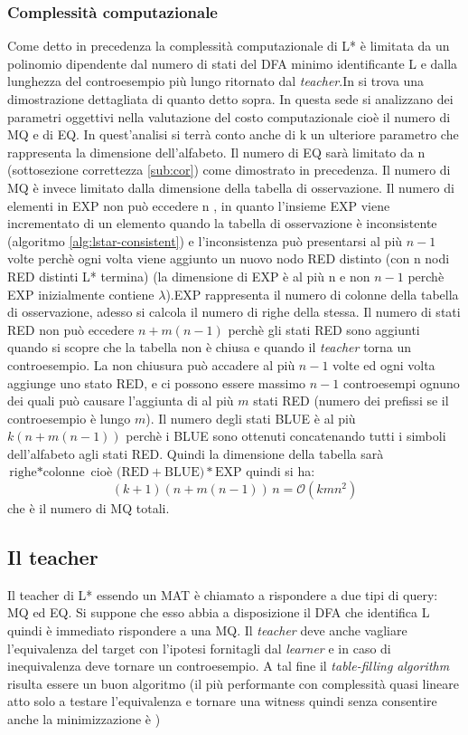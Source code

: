 \subsubsection{Complessità computazionale}Come detto in precedenza la complessità computazionale di L* è limitata da un polinomio dipendente dal numero di stati del DFA minimo identificante \ac{L} e dalla lunghezza del controesempio più lungo ritornato dal \textit{teacher}.In \cite{Angluin87} si trova una dimostrazione dettagliata di quanto detto sopra. In questa sede si analizzano dei parametri oggettivi nella valutazione del costo computazionale cioè il numero di \ac{MQ} e di \ac{EQ}. In quest'analisi si terrà conto anche di k un ulteriore parametro che rappresenta la dimensione dell'alfabeto. Il numero di \ac{EQ} sarà limitato da n (sottosezione correttezza \ref{sub:cor}) come dimostrato in precedenza. Il numero di \ac{MQ} è invece limitato dalla dimensione della tabella di osservazione. Il numero di elementi in EXP non può eccedere n , in quanto l'insieme EXP viene incrementato di un elemento quando la tabella di osservazione è inconsistente (algoritmo \ref{alg:lstar-consistent}) e l'inconsistenza può presentarsi al più $n-1$ volte perchè ogni volta viene aggiunto un nuovo nodo RED distinto (con n nodi RED distinti L* termina) (la dimensione di EXP è al più n e non $n-1$ perchè EXP inizialmente contiene $\lambda$).EXP rappresenta il numero di colonne della tabella di osservazione, adesso si calcola il numero di righe della stessa. Il numero di stati RED non può eccedere $n+m(n-1)$  perchè gli stati RED sono aggiunti quando si scopre che la tabella non è chiusa e quando il \textit{teacher} torna un controesempio.  La non chiusura può accadere al più $n-1$ volte ed ogni volta aggiunge uno stato RED, e ci possono essere massimo $n-1$ controesempi ognuno dei quali può causare l'aggiunta di al più $m$ stati RED (numero dei prefissi se il controesempio è lungo $m$). Il numero degli stati BLUE è al più $k(n+m(n-1))$ perchè i BLUE sono ottenuti concatenando tutti i simboli dell'alfabeto agli stati RED. Quindi la dimensione della tabella sarà $\text{righe} * \text{colonne}$ cioè $\text{(RED}+\text{BLUE)}*\text{EXP}$ quindi si ha:
\begin{equation*}
(k+1)(n+m(n-1))\,n = \mathcal{O}(kmn^{2})
\end{equation*}
che è il numero di \ac{MQ} totali.
\subsection{Il teacher} 
\label{sub:tea}Il teacher di L* essendo un \ac{MAT} è chiamato a rispondere a due tipi di query: \ac{MQ} ed \ac{EQ}. Si suppone che esso abbia a disposizione il DFA che identifica \ac{L} quindi è immediato rispondere a una \ac{MQ}. Il \textit{teacher} deve anche vagliare l'equivalenza del target con l'ipotesi fornitagli dal \textit{learner} e in caso di inequivalenza deve tornare un controesempio. A tal fine il \textit{table-filling algorithm} \cite{Nor09} risulta essere un buon algoritmo (il più performante con complessità quasi lineare atto solo a testare l'equivalenza e tornare una witness  quindi senza consentire anche la minimizzazione è \cite{Hop71} )
